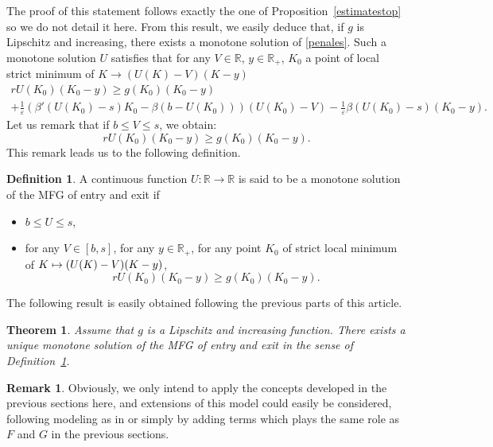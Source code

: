 \documentclass[JEP,XML,SOM,Unicode,NoEqCountersInSection,published]{cedram}
\newcommand\mto{\mathchoice{\longmapsto}{\mapsto}{\mapsto}{\mapsto}}
\let\epsilon\varepsilon
\newtheorem{Theorem}{Theorem}[section]
\theoremstyle{definition}
\newtheorem{Def}{Definition}[section]
\newtheorem{Rem}{Remark}[section]
\begin{document}
The proof of this statement follows exactly the one of Proposition~\ref{estimatestop} so we do not detail it here. From this result, we easily deduce that, if $g$ is Lipschitz and increasing, there exists a monotone solution of \eqref{penales}. Such a monotone solution $U$ satisfies that for any $V \in \mathbb{R}$, $y \in \mathbb{R}_+$, $K_0$ a point of local strict minimum of $K \to (U(K)-V)(K-y)$
\begin{multline*}
rU(K_0)(K_0-y) \geq g(K_0)(K_0-y)\\
+\frac{1}{\epsilon} \left(\beta'(U(K_0)-s)K_0-\beta(b-U(K_0))\right)(U(K_0)-V)
- \frac{1}{\epsilon}\beta(U(K_0) -s)(K_0-y).
\end{multline*}
Let us remark that if $b \leq V \leq s$, we obtain:
\begin{equation*}
rU(K_0)(K_0-y) \geq g(K_0)(K_0-y).
\end{equation*}
This remark leads us to the following definition.
\begin{Def}\label{defes}
A continuous function $U: \mathbb{R} \to \mathbb{R}$ is said to be a monotone solution of the MFG of entry and exit if
\begin{itemize}
\item $b \leq U \leq s$,
\item for any $V \in [b,s]$, for any $y \in \mathbb{R}_+$, for any point $K_0$ of strict local minimum of $K \mto (U(K)-V)(K-y)$,
\begin{equation*}
rU(K_0)(K_0-y) \geq g(K_0)(K_0-y).
\end{equation*}
\end{itemize}
\end{Def}
The following result is easily obtained following the previous parts of this article.
\begin{Theorem}
Assume that $g$ is a Lipschitz and increasing function. There exists a unique monotone solution of the MFG of entry and exit in the sense of Definition~\ref{defes}.
\end{Theorem}
\begin{Rem}
Obviously, we only intend to apply the concepts developed in the previous sections here, and extensions of this model could easily be considered, following modeling as in \cite{bertucci2020mean} or simply by adding terms which plays the same role as $F$ and $G$ in the previous sections.
\end{Rem}
\end{document}
